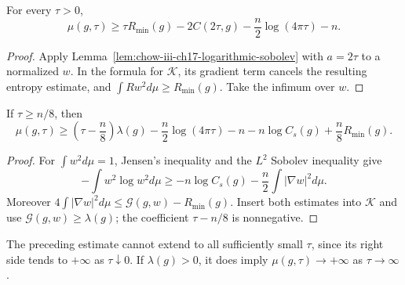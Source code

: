 \begin{lemma}
\label{lem:chow-iii-ch17-mu-lower-log-sobolev}


For every $\tau>0$,
\[
 \mu(g,\tau)\ge \tau R_{\min}(g)-2C(2\tau,g)
 -\frac n2\log(4\pi\tau)-n.
\]
\end{lemma}
\begin{proof}
\sketch Apply Lemma~\ref{lem:chow-iii-ch17-logarithmic-sobolev} with $a=2\tau$
to a normalized $w$.  In the formula for $\mathcal K$, its gradient term
cancels the resulting entropy estimate, and
$\int Rw^2d\mu\ge R_{\min}(g)$.  Take the infimum over $w$.
\end{proof}

\begin{lemma}
\label{lem:chow-iii-ch17-mu-lower-lambda}

If $\tau\ge n/8$, then
\[
 \mu(g,\tau)\ge\left(\tau-\frac n8\right)\lambda(g)
 -\frac n2\log(4\pi\tau)-n-n\log C_s(g)+\frac n8R_{\min}(g).
\]
\end{lemma}
\begin{proof}
\sketch For $\int w^2d\mu=1$, Jensen's inequality and the $L^2$ Sobolev inequality
give
\[
 -\int w^2\log w^2d\mu\ge-n\log C_s(g)
 -\frac n2\int|\nabla w|^2d\mu.
\]
Moreover
$4\int|\nabla w|^2d\mu\le\mathcal G(g,w)-R_{\min}(g)$.
Insert both estimates into $\mathcal K$ and use
$\mathcal G(g,w)\ge\lambda(g)$; the coefficient $\tau-n/8$ is
nonnegative.
\end{proof}

\begin{remark}
\label{rem:chow-iii-ch17-mu-lower-bound-scales}


The preceding estimate cannot extend to all sufficiently small $\tau$, since
its right side tends to $+\infty$ as $\tau\downarrow0$.  If
$\lambda(g)>0$, it does imply $\mu(g,\tau)\to+\infty$ as
$\tau\to\infty$.
\end{remark}

